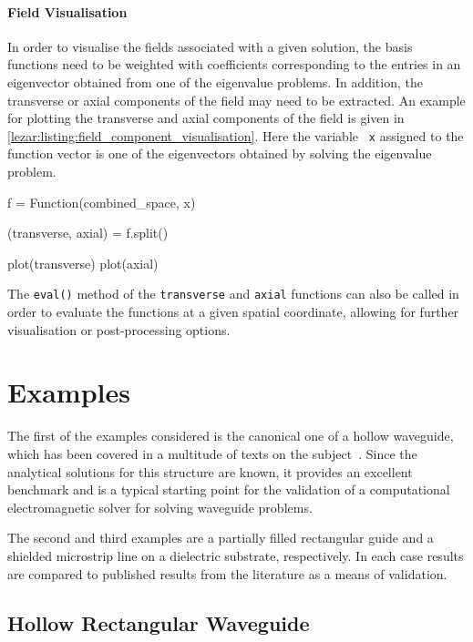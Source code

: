 \paragraph{Field Visualisation}

In order to visualise the fields associated with a given solution, the
basis functions need to be weighted with coefficients corresponding to
the entries in an eigenvector obtained from one of the eigenvalue
problems. In addition, the transverse or axial components of the field
may need to be extracted. An example for plotting the transverse and
axial components of the field is given in \lstlistingname{}
\ref{lezar:listing:field_component_visualisation}.  Here the variable {\tt
x} assigned to the function vector is one of the eigenvectors obtained
by solving the eigenvalue problem.

\begin{python}
f = Function(combined_space, x)

(transverse, axial) = f.split()

plot(transverse)
plot(axial)
\end{python}

The {\tt eval()} method of the {\tt transverse} and {\tt axial}
functions can also be called in order to evaluate the functions at a
given spatial coordinate, allowing for further visualisation or
post-processing options.

\section{Examples}
\label{lezar:sec:Examples}

The first of the examples considered is the canonical one of a hollow
waveguide, which has been covered in a multitude of texts on the
subject~\cite{Davidson2005, Jin2002, PelCoc1998, Poz2005}.  Since the
analytical solutions for this structure are known, it provides an
excellent benchmark and is a typical starting point for the validation
of a computational electromagnetic solver for solving waveguide
problems.

The second and third examples are a partially filled rectangular guide
and a shielded microstrip line on a dielectric substrate,
respectively. In each case results are compared to published results
from the literature as a means of validation.

\subsection{Hollow Rectangular Waveguide}

